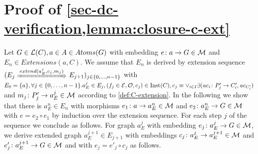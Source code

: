 \section{Proof of \cref{sec-dc-verification,lemma:closure-c-ext}}
\label{sec-proofs:lemma:closure-c-ext}
Let $G \in \mathcal{L}(C), a \in A \in Atoms(G)$ with embedding $e\colon a \to G \in {\cal M}$ and $E_n \in Extensions(a,C)$.
We assume that $E_n$ is derived by extension sequence $(E_j \Trans{extend(a_E^j,c_j,m_j)} E_{j+1})_{j \in \{0,\ldots,n-1\}}$ with $E_0=\{a\}, \forall j \in \{0,\ldots,n-1\}.a_E^j \in E_j, (f_j \in \mathcal{E},{\cal O},c_j) \in \mathrm{Inst}(C), c_j \equiv \vee_{i \in I} \exists (\mathit{ac}_i\colon P'_j \to C'_i, \mathit{ac}_{C'_i})$ and $m_j\colon P'_j \to a_E^j \in {\cal M}$ according to \cref{def:C-extension}.
In the following we show that there is $a_E^n \in E_n$  with morphisms $e_1\colon a \to a_E^n \in {\cal M}$ and $e_2\colon a_E^n \to G \in {\cal M}$ with $e=e_2 \circ e_1$ by induction over the extension sequence.
For each step $j$ of the sequence we conclude as follows.
For graph $a_E^j$ with embedding $e_j\colon a_E^j \to G \in {\cal M}$, we derive extended graph $a_E^{j+1} \in E_{j+1}$ with embeddings $c_j\colon a_E^j \to a_E^{j+1} \in {\cal M}$ and $e'_j\colon a_E^{j+1} \to G \in {\cal M}$ and with $e_j=e'_j \circ c_j$ as follows.\thispagestyle{plain}
